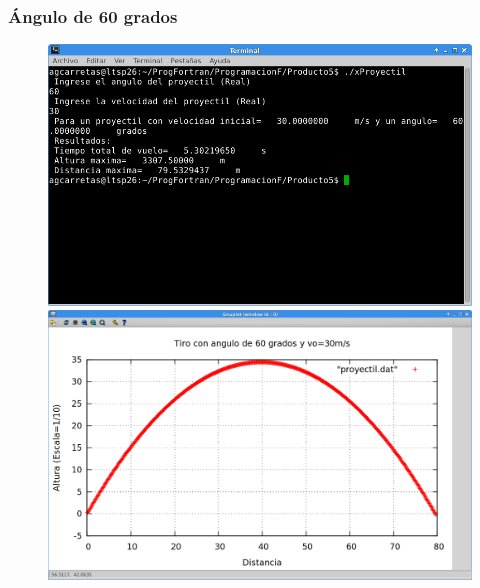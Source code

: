 \documentclass[a4paper]{article}
\begin{document}
\subsubsection{Ángulo de 60 grados}
\begin{figure}[H]
    \centering
    \includegraphics[width=12cm]{60} \\
    \includegraphics[width=12cm]{60plot}
  \end{figure} 
\end{document}
